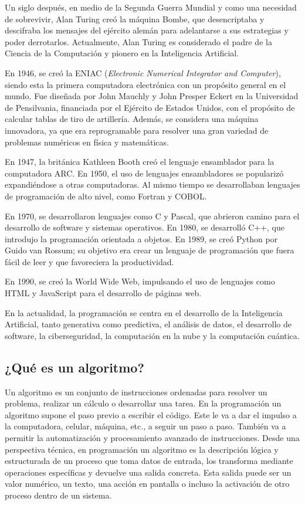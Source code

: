 \documentclass[12pt,letterpaper]{article}
\begin{document}
Un siglo después, en medio de la Segunda Guerra Mundial y como una necesidad de sobrevivir, Alan Turing creó la máquina Bombe, que desencriptaba y descifraba los mensajes del ejército alemán para adelantarse a sus estrategias y poder derrotarlos. Actualmente, Alan Turing es considerado el padre de la Ciencia de la Computación y pionero en la Inteligencia Artificial.

En 1946, se creó la ENIAC (\textit{Electronic Numerical Integrator and Computer}), siendo esta la primera computadora electrónica con un propósito general en el mundo. Fue diseñada por John Mauchly y John Presper Eckert en la Universidad de Pensilvania, financiada por el Ejército de Estados Unidos, con el propósito de calcular tablas de tiro de artillería. Además, se considera una máquina innovadora, ya que era reprogramable para resolver una gran variedad de problemas numéricos en física y matemáticas.

En 1947, la británica Kathleen Booth creó el lenguaje ensamblador para la computadora ARC. En 1950, el uso de lenguajes ensambladores se popularizó expandiéndose a otras computadoras. Al mismo tiempo se desarrollaban lenguajes de programación de alto nivel, como Fortran y COBOL.

En 1970, se desarrollaron lenguajes como C y Pascal, que abrieron camino para el desarrollo de software y sistemas operativos. En 1980, se desarrolló C++, que introdujo la programación orientada a objetos. En 1989, se creó Python por Guido van Rossum; su objetivo era crear un lenguaje de programación que fuera fácil de leer y que favoreciera la productividad.

En 1990, se creó la World Wide Web, impulsando el uso de lenguajes como HTML y JavaScript para el desarrollo de páginas web.

En la actualidad, la programación se centra en el desarrollo de la Inteligencia Artificial, tanto generativa como predictiva, el análisis de datos, el desarrollo de software, la ciberseguridad, la computación en la nube y la computación cuántica.

\subsection{¿Qué es un algoritmo?}
Un algoritmo es un conjunto de instrucciones ordenadas para resolver un problema, realizar un cálculo o desarrollar una tarea. En la programación un algoritmo supone el paso previo a escribir el código. Este le va a dar el impulso a la computadora, celular, máquina, etc., a seguir un paso a paso. También va a permitir la automatización y procesamiento avanzado de instrucciones. Desde una perspectiva técnica, en programación un algoritmo es la descripción lógica y estructurada de un proceso que toma datos de entrada, los transforma mediante operaciones específicas y devuelve una salida concreta. Esta salida puede ser un valor numérico, un texto, una acción en pantalla o incluso la activación de otro proceso dentro de un sistema.
\end{document}
